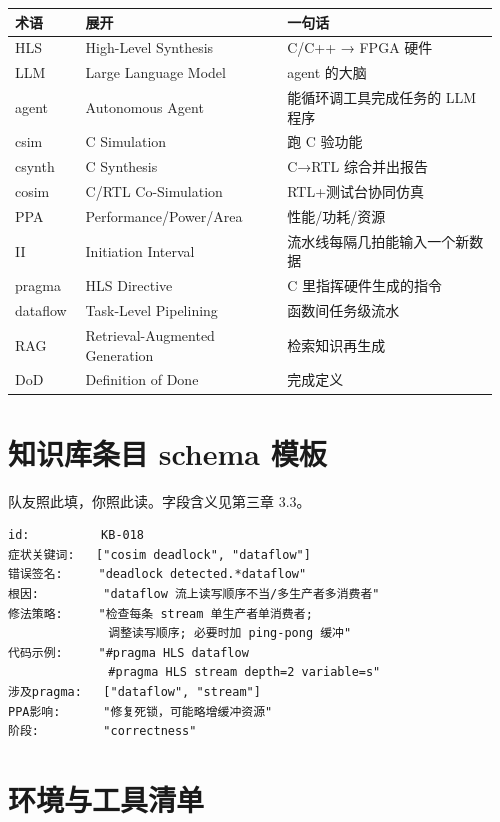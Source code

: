\documentclass[12pt,a4paper]{ctexbook}
\begin{document}
\begin{longtable}{@{}p{0.14\linewidth}p{0.40\linewidth}p{0.42\linewidth}@{}}
\toprule
\textbf{术语} & \textbf{展开} & \textbf{一句话} \\
\midrule
\endhead
HLS & High-Level Synthesis & C/C++ → FPGA 硬件 \\
LLM & Large Language Model & agent 的大脑 \\
agent & Autonomous Agent & 能循环调工具完成任务的 LLM 程序 \\
csim & C Simulation & 跑 C 验功能 \\
csynth & C Synthesis & C→RTL 综合并出报告 \\
cosim & C/RTL Co-Simulation & RTL+测试台协同仿真 \\
PPA & Performance/Power/Area & 性能/功耗/资源 \\
II & Initiation Interval & 流水线每隔几拍能输入一个新数据 \\
pragma & HLS Directive & C 里指挥硬件生成的指令 \\
dataflow & Task-Level Pipelining & 函数间任务级流水 \\
RAG & Retrieval-Augmented Generation & 检索知识再生成 \\
DoD & Definition of Done & 完成定义 \\
\bottomrule
\end{longtable}

\chapter{知识库条目 schema 模板}

队友照此填，你照此读。字段含义见第三章 3.3。

\begin{lstlisting}
id:          KB-018
症状关键词:   ["cosim deadlock", "dataflow"]
错误签名:     "deadlock detected.*dataflow"
根因:         "dataflow 流上读写顺序不当/多生产者多消费者"
修法策略:     "检查每条 stream 单生产者单消费者;
              调整读写顺序; 必要时加 ping-pong 缓冲"
代码示例:     "#pragma HLS dataflow
              #pragma HLS stream depth=2 variable=s"
涉及pragma:   ["dataflow", "stream"]
PPA影响:      "修复死锁，可能略增缓冲资源"
阶段:         "correctness"
\end{lstlisting}

\chapter{环境与工具清单}
\end{document}
